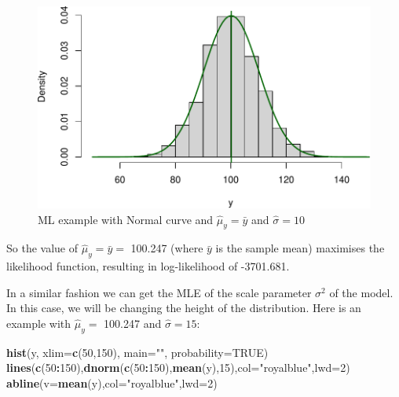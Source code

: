 \documentclass[
]{book}
\newenvironment{Shaded}{\begin{snugshade}}{\end{snugshade}}
\newcommand{\DataTypeTok}[1]{\textcolor[rgb]{0.13,0.29,0.53}{#1}}
\newcommand{\DecValTok}[1]{\textcolor[rgb]{0.00,0.00,0.81}{#1}}
\newcommand{\KeywordTok}[1]{\textcolor[rgb]{0.13,0.29,0.53}{\textbf{#1}}}
\newcommand{\NormalTok}[1]{#1}
\newcommand{\OperatorTok}[1]{\textcolor[rgb]{0.81,0.36,0.00}{\textbf{#1}}}
\newcommand{\OtherTok}[1]{\textcolor[rgb]{0.56,0.35,0.01}{#1}}
\newcommand{\StringTok}[1]{\textcolor[rgb]{0.31,0.60,0.02}{#1}}
\theoremstyle{definition}
\theoremstyle{definition}
\theoremstyle{definition}
\theoremstyle{definition}
\theoremstyle{remark}
\begin{document}
\begin{figure}
\centering
\includegraphics{Svetunkov---Statistics-for-Business-Analytics_files/figure-latex/MLENormalExample04-1.pdf}
\caption{\label{fig:MLENormalExample04}ML example with Normal curve and \(\hat{\mu}_y=\bar{y}\) and \(\hat{\sigma}=10\)}
\end{figure}

So the value of \(\hat{\mu}_y=\bar{y}=\) 100.247 (where \(\bar{y}\) is the sample mean) maximises the likelihood function, resulting in log-likelihood of -3701.681.

In a similar fashion we can get the MLE of the scale parameter \(\sigma^2\) of the model. In this case, we will be changing the height of the distribution. Here is an example with \(\hat{\mu}_y=\) 100.247 and \(\hat{\sigma}=15\):

\begin{Shaded}
\begin{Highlighting}[]
\KeywordTok{hist}\NormalTok{(y, }\DataTypeTok{xlim=}\KeywordTok{c}\NormalTok{(}\DecValTok{50}\NormalTok{,}\DecValTok{150}\NormalTok{), }\DataTypeTok{main=}\StringTok{""}\NormalTok{, }\DataTypeTok{probability=}\OtherTok{TRUE}\NormalTok{)}
\KeywordTok{lines}\NormalTok{(}\KeywordTok{c}\NormalTok{(}\DecValTok{50}\OperatorTok{:}\DecValTok{150}\NormalTok{),}\KeywordTok{dnorm}\NormalTok{(}\KeywordTok{c}\NormalTok{(}\DecValTok{50}\OperatorTok{:}\DecValTok{150}\NormalTok{),}\KeywordTok{mean}\NormalTok{(y),}\DecValTok{15}\NormalTok{),}\DataTypeTok{col=}\StringTok{"royalblue"}\NormalTok{,}\DataTypeTok{lwd=}\DecValTok{2}\NormalTok{)}
\KeywordTok{abline}\NormalTok{(}\DataTypeTok{v=}\KeywordTok{mean}\NormalTok{(y),}\DataTypeTok{col=}\StringTok{"royalblue"}\NormalTok{,}\DataTypeTok{lwd=}\DecValTok{2}\NormalTok{)}
\end{Highlighting}
\end{Shaded}
\end{document}
